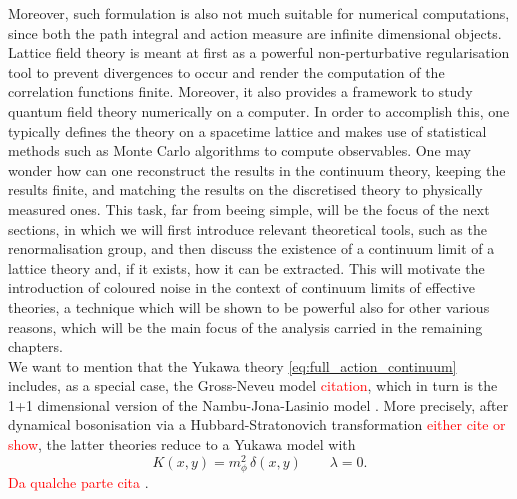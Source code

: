 Moreover, such formulation is also not much suitable for numerical computations, since both the path integral and action measure are infinite dimensional objects. \\
Lattice field theory \cite{Montvay1994QuantumLattice,rothe_LGT,gattringer_LQCD,creutz_2023} is meant at first as a powerful non-perturbative regularisation tool to prevent divergences to occur and render the computation of the correlation functions finite. Moreover, it also provides a framework to study quantum field theory numerically on a computer. In order to accomplish this, one typically defines the theory on a spacetime lattice and makes use of statistical methods such as Monte Carlo algorithms to compute observables. One may wonder how can one reconstruct the results in the continuum theory, keeping the results finite, and matching the results on the discretised theory to physically measured ones. This task, far from beeing simple, will be the focus of the next sections, in which we will first introduce relevant theoretical tools, such as the renormalisation group, and then discuss the existence of a continuum limit of a lattice theory and, if it exists, how it can be extracted. This will motivate the introduction of coloured noise in the context of continuum limits of effective theories, a technique which will be shown to be powerful also for other various reasons, which will be the main focus of the analysis carried in the remaining chapters. \\
We want to mention that the Yukawa theory \eqref{eq:full_action_continuum} includes, as a special case, the Gross-Neveu model \textcolor{red}{citation}, which in turn is the 1+1 dimensional version of the Nambu-Jona-Lasinio model \cite{Nambu1961DynamicalI, Nambu1961DynamicalII}.
More precisely, after dynamical bosonisation via a Hubbard-Stratonovich transformation \textcolor{red}{either cite or show}, the latter theories reduce to a Yukawa model with 
\begin{equation*}
    K(x,y) = m_\phi^2 \, \delta(x,y) \qquad \lambda = 0.
\end{equation*}
\textcolor{red}{Da qualche parte cita \cite{carosso2020novel}}. \\~\\
